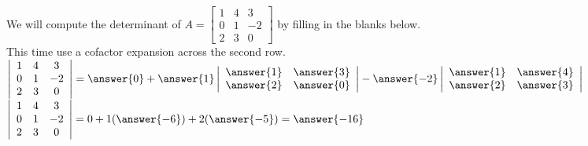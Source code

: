 \documentclass{ximera}
\begin{document}
    	  	 \begin{question} We will compute the determinant of $A = \begin{bmatrix} 1& 4&3 \\ 0 &1 &-2 \\ 2&3& 0\end{bmatrix}$ by filling in the blanks below. \\
    	  	 	
    	  	 	This time use a cofactor expansion across the second row. \\
    	  	 	
    	  	 	$\left|\begin{array}{ccc} 1&4 &3 \\ 0 &1 &-2 \\ 2&3& 0\end{array}\right| = \answer{0}
    	  	 	+\answer{1}\left|\begin{array}{ccc} \answer{1}&  \answer{3}\\  \answer{2} & \answer{0}  \end{array}\right| 
    	  	 	-\answer{-2}\left|\begin{array}{ccc} \answer{1}&  \answer{4}\\  \answer{2} & \answer{3}  \end{array}\right| $	\vspace{10pt}\\
    	  	 	$\left|\begin{array}{ccc} 1&4 &3 \\ 0 &1 &-2 \\ 2&3& 0\end{array}\right| = 0 + 1(\answer{-6}) + 2(\answer{-5}) =\answer{-16}$
    	  	 \end{question}	
    	  	 
\end{document}
